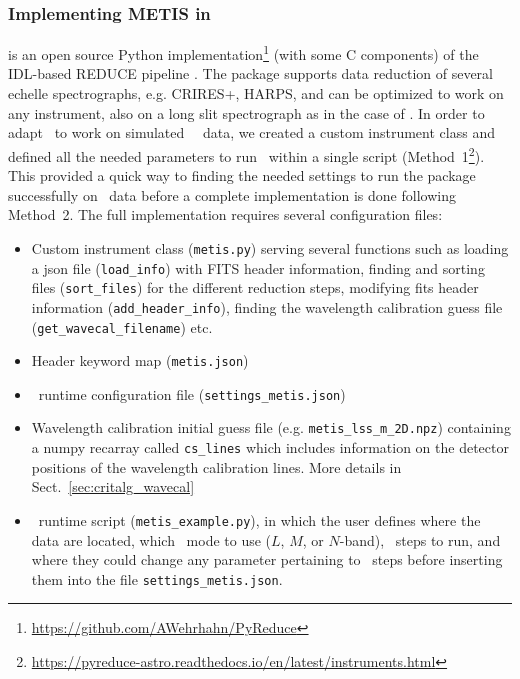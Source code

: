 \subsubsection{Implementing METIS in \pyred}\label{sec:pyred_mic}
\pyred \cite{pis21} is an  open source Python implementation\footnote{\url{https://github.com/AWehrhahn/PyReduce}} (with some C components)  of the IDL-based REDUCE pipeline \cite{pis02}.  The package supports data reduction of several echelle spectrographs, e.g. CRIRES+,  HARPS, and can be optimized to work on any instrument, also on a  long slit spectrograph as in the case of \met. In order to adapt \pyred~to work on simulated \met~\lss~data, we created a custom instrument class  and defined all the needed parameters to run \pyred~within a single script (Method~1\footnote{\url{https://pyreduce-astro.readthedocs.io/en/latest/instruments.html}}). This provided a quick way to finding the needed settings to  run the package successfully on \met~data before a complete implementation is done following Method~2. The full implementation requires several configuration files: 
\begin{itemize}
\item Custom instrument class (\texttt{metis.py}) serving several functions such as loading a json file (\texttt{load\_info}) with FITS header information, finding  and sorting files (\texttt{sort\_files}) for the different reduction steps, modifying fits header information (\texttt{add\_header\_info}), finding the wavelength calibration guess file (\texttt{get\_wavecal\_filename}) etc.
\item Header keyword map (\texttt{metis.json})
\item \pyred~runtime configuration file (\texttt{settings\_metis.json}) 
\item Wavelength calibration initial guess  file (e.g. \texttt{metis\_lss\_m\_2D.npz}) containing a numpy recarray called \texttt{cs\_lines} which includes information on the detector positions of the wavelength calibration lines.
 More details in Sect.~\ref{sec:critalg_wavecal}
\item \pyred~runtime script (\texttt{metis\_example.py}), in which the user defines where the data are located, which \met \lss~mode to use ($L$, $M$, or $N$-band), \pyred~steps to run, and where they could change any parameter pertaining to \pyred~steps before inserting them into the file \texttt{settings\_metis.json}.
\end{itemize}

